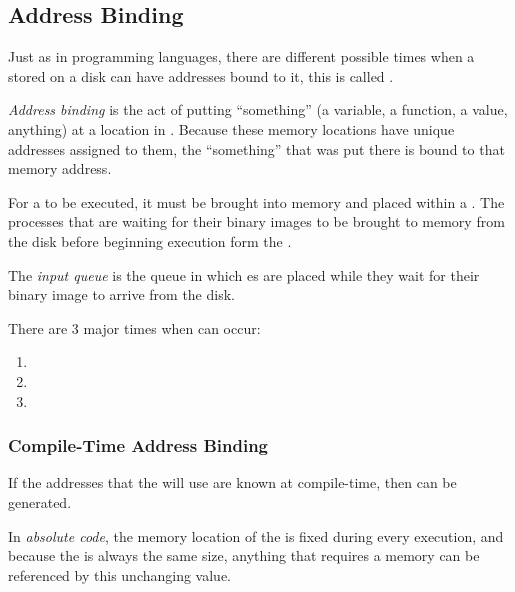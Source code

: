 \subsection{Address Binding}\label{subsec:Address_Binding}
Just as in programming languages, there are different possible times when a  stored on a disk can have  addresses bound to it, this is called .

\begin{definition}\label{def:Address_Binding}
  \emph{Address binding} is the act of putting ``something'' (a variable, a function, a value, anything) at a location in .
  Because these memory locations have unique addresses assigned to them, the ``something'' that was put there is bound to that memory address.
\end{definition}

For a  to be executed, it must be brought into memory and placed within a .
The processes that are waiting for their binary images to be brought to memory from the disk before beginning execution form the .

\begin{definition}\label{def:Input_Queue}
  The \emph{input queue} is the queue in which es are placed while they wait for their  binary image to arrive from the disk.
\end{definition}

There are 3 major times when  can occur:
\begin{enumerate}[noitemsep]
\item {}
\item {}
\item {}
\end{enumerate}

\subsubsection{Compile-Time Address Binding}\label{subsubsec:Compile_Time_Address_Binding}
If the addresses that the  will use are known at compile-time, then  can be generated.

\begin{definition}\label{def:Absolute_Code}
  In \emph{absolute code}, the memory location of the  is fixed during every execution, and because the  is always the same size, anything that requires a memory can be referenced by this unchanging value.
\end{definition}


